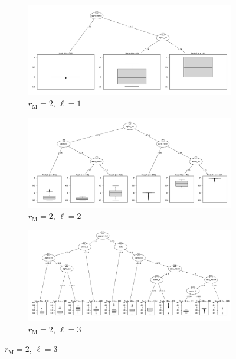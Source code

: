 \documentclass[10pt]{article}
\newcommand{\mooreRange}{r_\mathrm{M}}
\theoremstyle{definition}
\begin{document}
\begin{figure}[!ht]
\begin{subfigure}[b]{.45\textwidth}
    \end{subfigure}
    \begin{subfigure}[b]{.45\textwidth}
\includegraphics[width=\textwidth,trim={1cm 1cm 1cm 0cm},clip]{../cellular_automata/results/cart/m2_l1_tree.pdf}
\caption{$\mooreRange=2$, $\ell=1$}
    \end{subfigure}
    \begin{subfigure}[b]{.45\textwidth}
\includegraphics[width=\textwidth,trim={1cm 1cm 1cm 0cm},clip]{../cellular_automata/results/cart/m2_l2_tree.pdf}
\caption{$\mooreRange=2$, $\ell=2$}
    \end{subfigure}
    \begin{subfigure}[b]{.45\textwidth}
\includegraphics[width=\textwidth,trim={1cm 1cm 1cm 0cm},clip]{../cellular_automata/results/cart/m2_l3_tree.pdf}
\caption{$\mooreRange=2$, $\ell=3$}

\end{subfigure}
\end{figure}
\end{document}
